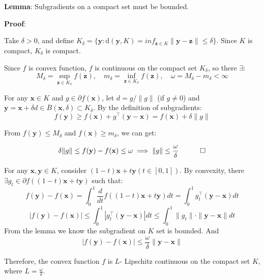 \documentclass{article}
\begin{document}
\section{}
 
\textbf{Lemma}: Subgradients on a compact set must be bounded.

\textbf{Proof}:

Take $ \delta > 0 $, and define $ K_\delta = \{ \mathbf{y} : \text{d}(\mathbf{y}, K) =inf_{\mathbf{z}\in K}\|\mathbf{y}-\mathbf{z}\| \leq \delta \} $.  Since $ K $ is compact, $ K_\delta $ is compact.

Since $ f $ is convex function, $ f $ is continuous on the compact set $ K_\delta $, so there $\exists$:  
$$
M_\delta = \sup_{\mathbf{z} \in K_\delta} f(\mathbf{z}), \quad m_\delta = \inf_{\mathbf{z} \in K_\delta} f(\mathbf{z}), \quad \omega = M_\delta - m_\delta < \infty
$$  

For any $ \mathbf{x} \in K $ and $ g \in \partial f(\mathbf{x}) $, let $ d = g / \|g\| $ (if $ g \neq 0 $) and $ \mathbf{y} = \mathbf{x} + \delta d \in \overline{B}(\mathbf{x}, \delta) \subset K_\delta $. By the definition of subgradients:  
$$
f(\mathbf{y}) \geq f(\mathbf{x}) + g^\top (\mathbf{y} - \mathbf{x}) = f(\mathbf{x}) + \delta \|g\|
$$  

From $ f(\mathbf{y}) \leq M_\delta $ and $ f(\mathbf{x}) \geq m_\delta $, we can get:  

$$\delta \|g\| \leq f(\mathbf{y}) - f(\mathbf{x}) \leq \omega \implies \|g\| \leq \frac{\omega}{\delta} \quad \qed
$$  

For any $ \mathbf{x}, \mathbf{y} \in K $, consider $(1 - t)\mathbf{x} + t\mathbf{y} (t \in [0, 1]) $. By convexity,  there $\exists  g_t \in \partial f((1 - t)\mathbf{x} + t\mathbf{y}) $ such that:
$$f(\mathbf{y}) - f(\mathbf{x}) = \int_{0}^{1} \frac{d}{dt}f((1 - t)\mathbf{x} + t\mathbf{y}) dt = \int_{0}^{1} g_t^\top (\mathbf{y} - \mathbf{x}) dt
$$
$$
|f(\mathbf{y}) - f(\mathbf{x})| \leq \int_{0}^{1} |g_t^\top (\mathbf{y} - \mathbf{x})| dt \leq \int_{0}^{1} \|g_t\| \cdot \|\mathbf{y} - \mathbf{x}\| dt
$$
From the lemma we know the subgradient on $ K $ set is bounded. And
$$
|f(\mathbf{y}) - f(\mathbf{x})| \leq \frac{\omega}{\delta} \|\mathbf{y} - \mathbf{x}\|
$$
 
Therefore, the convex function $ f $ is $L$- Lipschitz continuous on the compact set $ K $, where $L=\frac{\omega}{\delta}$.
 
\section{}
 
\end{document}
